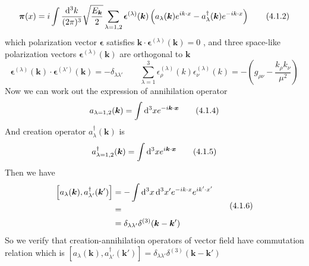 \documentclass[12pt]{article}
\begin{document}
\begin{spacing}{1.5}
\begin{equation}
\bm{\pi}(x) = i \int \frac{\dif^{3}k}{(2\pi)^{3}} \sqrt{\frac{E_{\bm k}}{2}} \sum\limits_{\lambda=1,2} \bm\epsilon^{(\lambda)}(\bm k) \left(a_{\lambda}(\bm k)e^{ik \cdot x}-a_{\lambda}^{\dagger}(\bm k)e^{-ik \cdot x}\right) 	%
	\tag{4.1.2}
\end{equation}
which polarization vector $\bm\epsilon$ satisfies $\bm k \cdot \bm\epsilon^{(\lambda)}(\bm k)=0$ , and three space-like polarization vectors $\bm\epsilon^{(\lambda)}(\bm k)$ are orthogonal to $\bm k$
\begin{equation}
\bm\epsilon^{(\lambda)}(\bm k) \cdot \bm\epsilon^{(\lambda')}(\bm k) = -\delta_{\lambda\lambda'} \qquad \sum\limits_{\lambda=1}^{3} \epsilon^{(\lambda)}_{\rho}(k)\epsilon^{(\lambda)}_{\nu}(k) = -\left( g_{\rho\nu}-\frac{k_{\rho}k_{\nu}}{\mu^{2}} \right)
	\tag{4.1.3}
\end{equation}
Now we can work out the expression of annihilation operator
\begin{equation}
a_{\lambda=1,2}(\bm k) = \int \mathop{}\!\mathrm{d}^{3}x e^{-i\bm k \cdot \bm x}
	\tag{4.1.4}
\end{equation}
And creation operator $a_{\lambda}^{\dagger}(\bm k)$ is
\begin{equation}
a_{\lambda=1,2}^{\dagger}(\bm k) = \int \mathop{}\!\mathrm{d}^{3}x e^{i\bm k \cdot \bm x}
	\tag{4.1.5}
\end{equation}
Then we have
\begin{equation}
\begin{aligned}
\left[a_{\lambda}(\bm k), a_{\lambda'}^{\dagger}(\bm k')\right] &= -\int \dif^{3}x\dif^{3}x'e^{-ik \cdot x}e^{ik' \cdot x'} \\		%
&= \\
&= \delta_{\lambda\lambda'}\delta^{(3)}(\bm k - \bm k')
\end{aligned}
	\tag{4.1.6}
\end{equation}
So we verify that creation-annihilation operators of vector field have commutation relation which is $\left[a_{\lambda}(\bm k), a_{\lambda'}^{\dagger}(\bm k')\right] = \delta_{\lambda\lambda'}\delta^{(3)}(\bm k - \bm k')$





\end{spacing} 		%
\end{document}
